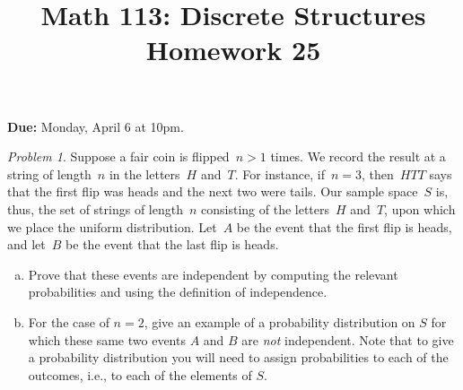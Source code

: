 \documentclass[11pt,twoside]{amsart}
\title{Math 113: Discrete Structures\\ Homework 25}
\theoremstyle{plain}
\theoremstyle{remark}
\newtheorem{prob}[prop]{Problem}
\theoremstyle{definition}
\theoremstyle{definition}
\begin{document}
\maketitle

\noindent
\textbf{Due:} Monday, April 6 at 10pm.
\bigskip

\begin{prob}\label{independence} 
Suppose a fair coin is flipped~$n>1$ times. We record the result at a string of
length~$n$ in the letters~$H$ and~$T$.  For instance, if~$n=3$, then~$HTT$ says
that the first flip was heads and the next two were tails.  Our sample
space~$S$ is, thus, the set of strings of length~$n$ consisting of the
letters~$H$ and~$T$, upon which we place the uniform distribution.
Let~$A$ be the event that the first flip is heads, and let~$B$ be the event that
the last flip is heads.  

\begin{enumerate}[(a)]
    \item Prove that these events are independent by computing
 the relevant probabilities and using the definition of independence.
   \item For the case of $n=2$, give an example of a probability distribution on $S$ for which these same two events $A$ and $B$ are \emph{not} independent. Note that to give a probability distribution you will need to assign probabilities to each of the outcomes, i.e., to each of the elements of $S$.
\end{enumerate}
\end{prob}
\end{document}

